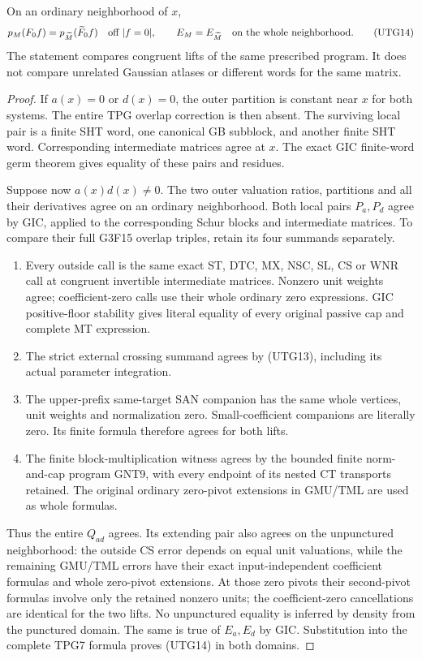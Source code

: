 \begin{theorem}
On an ordinary neighborhood of $x$,
\[
 p_M(F_0f)=p_{\widetilde M}(\widetilde F_0f)
                    \quad\hbox{off }|f=0|,\qquad
 E_M=E_{\widetilde M}\quad\hbox{on the whole neighborhood}.
 \tag{UTG14}
\]
The statement compares congruent lifts of the same prescribed
program.  It does not compare unrelated Gaussian atlases or
different words for the same matrix.
\end{theorem}

\begin{proof}
If $a(x)=0$ or $d(x)=0$, the outer partition is constant
near $x$ for both systems.  The entire TPG overlap correction
is then absent.  The surviving local pair is a finite SHT
word, one canonical GB subblock, and another finite SHT
word.  Corresponding intermediate matrices agree at $x$.
The exact GIC finite-word germ theorem gives equality of
these pairs and residues.

Suppose now $a(x)d(x)\ne0$.  The two outer valuation ratios,
partitions and all their derivatives agree on an ordinary
neighborhood.  Both local pairs $P_a,P_d$ agree by GIC,
applied to the corresponding Schur blocks and intermediate
matrices.  To compare their full G3F15 overlap triples,
retain its four summands separately.
\begin{enumerate}
\item Every outside call is the same exact ST, DTC, MX, NSC,
      SL, CS or WNR call at congruent invertible intermediate
      matrices.  Nonzero unit weights agree; coefficient-zero
      calls use their whole ordinary zero expressions.
      GIC positive-floor stability gives literal equality of
      every original passive cap and complete MT expression.
\item The strict external crossing summand agrees by (UTG13),
      including its actual parameter integration.
\item The upper-prefix same-target SAN companion has the same
      whole vertices, unit weights and normalization zero.
      Small-coefficient companions are literally zero.
      Its finite formula therefore agrees for both lifts.
\item The finite block-multiplication witness agrees by the
      bounded finite norm-and-cap program GNT9, with every
      endpoint of its nested CT transports retained.  The
      original ordinary zero-pivot extensions in GMU/TML
      are used as whole formulas.
\end{enumerate}
Thus the entire $Q_{ad}$ agrees.  Its extending pair also
agrees on the unpunctured neighborhood: the outside CS error
depends on equal unit valuations, while the remaining GMU/TML
errors have their exact input-independent coefficient formulas
and whole zero-pivot extensions.  At those zero pivots their
second-pivot formulas involve only the retained nonzero units;
the coefficient-zero cancellations are identical for the two
lifts.  No unpunctured equality is inferred by density from
the punctured domain.  The same is true of $E_a,E_d$ by
GIC.  Substitution into the complete TPG7 formula proves
(UTG14) in both domains.
\end{proof}

